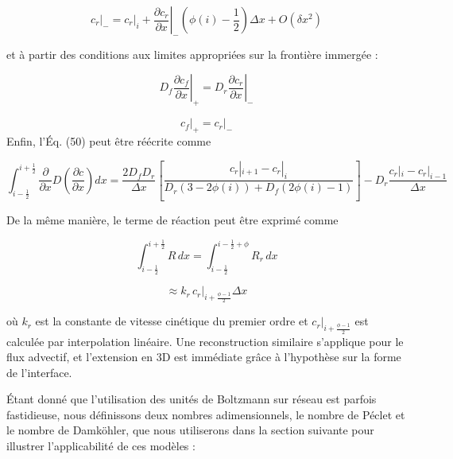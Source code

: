 \documentclass[12pt,a4paper]{report}
\begin{document}
\begin{equation}
c_r\Big|_{-}
=
c_r\Big|_{i}
+
\left.
\frac{\partial c_r}{\partial x}
\right|_{-}
\left(
\phi(i)-\frac{1}{2}
\right)\Delta x
+
O(\delta x^2)
\tag{54}
\end{equation}

et à partir des conditions aux limites appropriées sur la frontière immergée :

\begin{equation}
D_f
\left.
\frac{\partial c_f}{\partial x}
\right|_{+}
=
D_r
\left.
\frac{\partial c_r}{\partial x}
\right|_{-}
\tag{55}
\end{equation}

\begin{equation}
c_f\Big|_{+}
=
c_r\Big|_{-}
\tag{56}
\end{equation}
Enfin, l'Éq. (50) peut être réécrite comme

\begin{equation}
\int_{i-\frac{1}{2}}^{i+\frac{1}{2}} \frac{\partial}{\partial x} D \left( \frac{\partial c}{\partial x} \right) dx = \frac{2 D_f D_r}{\Delta x} \left[ \frac{c_r|_{i+1} - c_r|_i}{D_r (3 - 2\phi(i)) + D_f (2\phi(i) - 1)} \right] 
- D_r \frac{c_r|_i - c_r|_{i-1}}{\Delta x}
\label{eq:57}
\end{equation}

De la même manière, le terme de réaction peut être exprimé comme

\begin{equation}
\int_{i-\frac{1}{2}}^{i+\frac{1}{2}} R \, dx = \int_{i-\frac{1}{2}}^{i-\frac{1}{2} + \phi} R_r \, dx
\label{eq:58}
\end{equation}

\begin{equation}
\approx k_r \, c_r|_{i + \frac{\phi - 1}{2}} \Delta x
\label{eq:59}
\end{equation}

où $k_r$ est la constante de vitesse cinétique du premier ordre et $c_r|_{i + \frac{\phi-1}{2}}$ est calculée par interpolation linéaire. Une reconstruction similaire s'applique pour le flux advectif, et l'extension en 3D est immédiate grâce à l'hypothèse sur la forme de l'interface.

Étant donné que l'utilisation des unités de Boltzmann sur réseau est parfois fastidieuse, nous définissons deux nombres adimensionnels, le nombre de Péclet et le nombre de Damköhler, que nous utiliserons dans la section suivante pour illustrer l'applicabilité de ces modèles :
\end{document}
